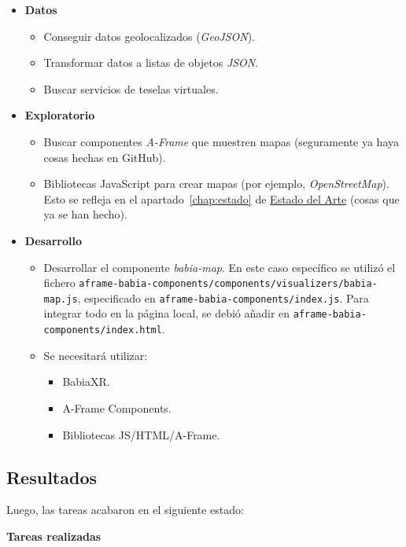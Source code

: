 \documentclass[a4paper, 12pt]{book}
\begin{document}
\begin{itemize}
    \item \textbf{Datos}
    \begin{itemize}
        \item Conseguir datos geolocalizados (\textit{GeoJSON}).
        \item Transformar datos a listas de objetos \textit{JSON}.
        \item Buscar servicios de teselas virtuales.
    \end{itemize}
    \item \textbf{Exploratorio}
    \begin{itemize}
        \item Buscar componentes \textit{A-Frame} que muestren mapas (seguramente ya haya cosas hechas en GitHub).
        \item Bibliotecas JavaScript para crear mapas (por ejemplo, \textit{OpenStreetMap}). Esto se refleja en el apartado~\ref{chap:estado} de \underline{Estado del Arte} (cosas que ya se han hecho).
    \end{itemize}
    \item \textbf{Desarrollo}
    \begin{itemize}
        \item Desarrollar el componente \textit{babia-map}. En este caso específico se utilizó el fichero \texttt{aframe-babia-components/components/visualizers/babia-map.js}, especificado en \texttt{aframe-babia-components/index.js}. Para integrar todo en la página local, se debió añadir en \texttt{aframe-babia-components/index.html}.
        \item Se necesitará utilizar:
        \begin{itemize}
            \item BabiaXR.
            \item A-Frame Components.
            \item Bibliotecas JS/HTML/A-Frame.
        \end{itemize}
    \end{itemize}
\end{itemize}

\subsection{Resultados}
\label{subsec:resultados-f2}

Luego, las tareas acabaron en el siguiente estado:

\vspace{1em}
\textbf{Tareas realizadas}
\end{document}
